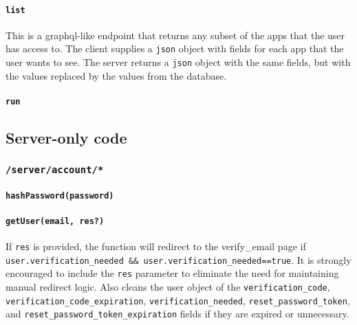 \hypertarget{list}{%
\paragraph{\texorpdfstring{\texttt{list}}{list}}\label{list}}

This is a graphql-like endpoint that returns any subset of the apps that
the user has access to. The client supplies a \texttt{json} object with
fields for each app that the user wants to see. The server returns a
\texttt{json} object with the same fields, but with the values replaced
by the values from the database.

\hypertarget{run}{%
\paragraph{\texorpdfstring{\texttt{run}}{run}}\label{run}}

\hypertarget{server-only-code}{%
\subsection{Server-only code}\label{server-only-code}}

\hypertarget{serveraccount}{%
\subsubsection{\texorpdfstring{\texttt{/server/account/*}}{/server/account/*}}\label{serveraccount}}

\hypertarget{hashpasswordpassword}{%
\paragraph{\texorpdfstring{\texttt{hashPassword(password)}}{hashPassword(password)}}\label{hashpasswordpassword}}

\hypertarget{getuseremail-res}{%
\paragraph{\texorpdfstring{\texttt{getUser(email,\ res?)}}{getUser(email, res?)}}\label{getuseremail-res}}

If \texttt{res} is provided, the function will redirect to the
verify\_email page if
\texttt{user.verification\_needed\ \&\&\ user.verification\_needed==true}.
It is strongly encouraged to include the \texttt{res} parameter to
eliminate the need for maintaining manual redirect logic. Also cleans
the user object of the \texttt{verification\_code},
\texttt{verification\_code\_expiration}, \texttt{verification\_needed},
\texttt{reset\_password\_token}, and
\texttt{reset\_password\_token\_expiration} fields if they are expired
or unnecessary.

